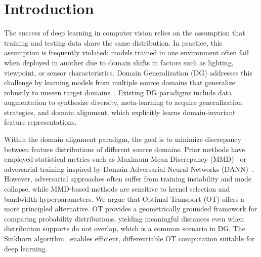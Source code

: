\documentclass[preprint,12pt]{elsarticle}
\begin{document}
\section{Introduction}
\label{sec:introduction}

The success of deep learning in computer vision relies on the assumption that training and testing data share the same distribution. In practice, this assumption is frequently violated: models trained in one environment often fail when deployed in another due to domain shifts in factors such as lighting, viewpoint, or sensor characteristics. Domain Generalization (DG) addresses this challenge by learning models from multiple source domains that generalize robustly to unseen target domains~\citep{zhou2022domain}. Existing DG paradigms include data augmentation to synthesize diversity, meta-learning to acquire generalization strategies, and domain alignment, which explicitly learns domain-invariant feature representations.

Within the domain alignment paradigm, the goal is to minimize discrepancy between feature distributions of different source domains. Prior methods have employed statistical metrics such as Maximum Mean Discrepancy (MMD)~\citep{li2018domain_mmd} or adversarial training inspired by Domain-Adversarial Neural Networks (DANN)~\citep{ganin2016domain}. However, adversarial approaches often suffer from training instability and mode collapse, while MMD-based methods are sensitive to kernel selection and bandwidth hyperparameters. We argue that Optimal Transport (OT) offers a more principled alternative. OT provides a geometrically grounded framework for comparing probability distributions, yielding meaningful distances even when distribution supports do not overlap, which is a common scenario in DG. The Sinkhorn algorithm~\citep{cuturi2013sinkhorn} enables efficient, differentiable OT computation suitable for deep learning.
\end{document}
